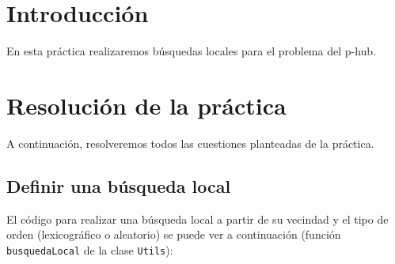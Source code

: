 \documentclass[12pt,a4paper,twoside,openright,titlepage,final]{article}
\author{José Ignacio Escribano}
\begin{document}
\setcounter{page}{1}


\listoftables
\thispagestyle{empty}
\newpage

\listoffigures
\thispagestyle{empty}
\newpage

\tableofcontents
\thispagestyle{empty}
\newpage


\setcounter{page}{1}

\section{Introducción}

En esta práctica realizaremos búsquedas locales para el problema del p-hub.

\section{Resolución de la práctica}

A continuación, resolveremos todos las cuestiones planteadas de la práctica.

\subsection{Definir una búsqueda local}

El código para realizar una búsqueda local a partir de su vecindad y el tipo de orden (lexicográfico o aleatorio) se puede ver a continuación (función \texttt{busquedaLocal} de la clase \texttt{Utils}):
\end{document}
